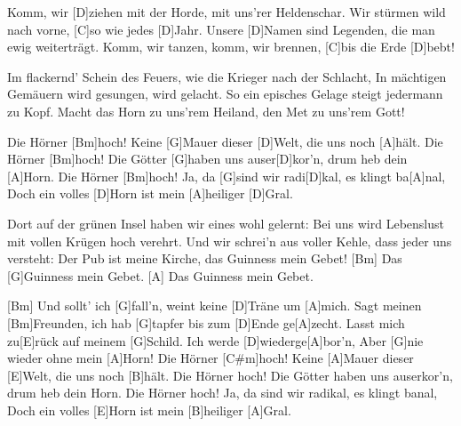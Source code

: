 

\begin{guitar}
	Komm, wir [D]ziehen mit der Horde, mit uns'rer Heldenschar.
	Wir stürmen wild nach vorne, [C]so wie jedes [D]Jahr.
	Unsere [D]Namen sind Legenden, die man ewig weiterträgt.
	Komm, wir tanzen, komm, wir brennen, [C]bis die Erde [D]bebt!
	
	Im flackernd' Schein des Feuers, wie die Krieger nach der Schlacht,
	In mächtigen Gemäuern wird gesungen, wird gelacht.
	So ein episches Gelage steigt jedermann zu Kopf.
	Macht das Horn zu uns'rem Heiland, den Met zu uns'rem Gott!
	
	Die Hörner [Bm]hoch! Keine [G]Mauer dieser [D]Welt, die uns noch [A]hält.
	Die Hörner [Bm]hoch! Die Götter [G]haben uns auser[D]kor'n, drum heb dein [A]Horn.
	Die Hörner [Bm]hoch! Ja, da [G]sind wir radi[D]kal, es klingt ba[A]nal,
	Doch ein volles [D]Horn ist mein [A]heiliger [D]Gral.
	
	Dort auf der grünen Insel haben wir eines wohl gelernt:
	Bei uns wird Lebenslust mit vollen Krügen hoch verehrt.
	Und wir schrei'n aus voller Kehle, dass jeder uns versteht:
	Der Pub ist meine Kirche, das Guinness mein Gebet!
	[Bm] Das [G]Guinness mein Gebet.
	[A] Das Guinness mein Gebet.
	
	 
	
	[Bm] Und sollt' ich [G]fall'n, weint keine [D]Träne um [A]mich.
	Sagt meinen [Bm]Freunden, ich hab [G]tapfer bis zum [D]Ende ge[A]zecht.
	Lasst mich zu[E]rück auf meinem [G]Schild. Ich werde [D]wiederge[A]bor'n,
	Aber [G]nie wieder ohne mein [A]Horn!
	\pagebreak
	Die Hörner [C#m]hoch! Keine [A]Mauer dieser [E]Welt, die uns noch [B]hält.
	Die Hörner hoch! Die Götter haben uns auserkor'n, drum heb dein Horn.
	Die Hörner hoch! Ja, da sind wir radikal, es klingt banal,
	Doch ein volles [E]Horn ist mein [B]heiliger [A]Gral.
\end{guitar}